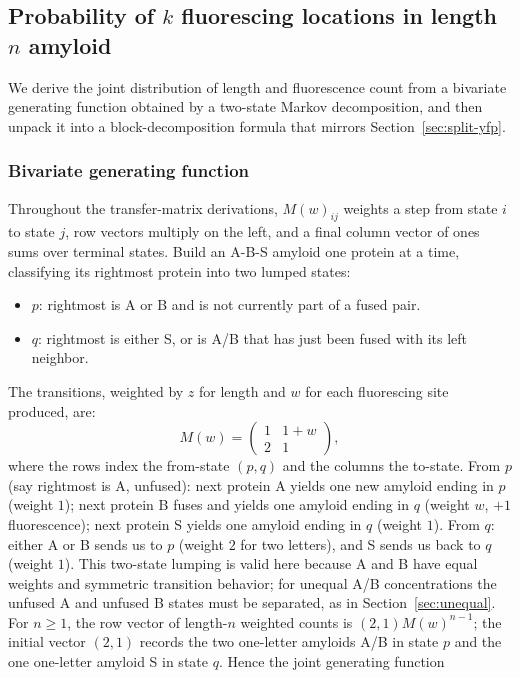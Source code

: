\documentclass[referee,lineno,pdflatex,sn-mathphys-ay]{sn-jnl}
\begin{document}
\subsection{Probability of $k$ fluorescing locations in length $n$ amyloid}\label{subsec:s3-dist}

We derive the joint distribution of length and fluorescence count from a bivariate generating function obtained by a two-state Markov decomposition, and then unpack it into a block-decomposition formula that mirrors Section~\ref{sec:split-yfp}.

\subsubsection{Bivariate generating function} Throughout the transfer-matrix derivations, $M(w)_{ij}$ weights a step from state $i$ to state $j$, row vectors multiply on the left, and a final column vector of ones sums over terminal states. Build an A-B-S amyloid one protein at a time, classifying its rightmost protein into two lumped states:
\begin{itemize}
\item \textbf{$p$}: rightmost is A or B and is not currently part of a fused pair.
\item \textbf{$q$}: rightmost is either S, or is A/B that has just been fused with its left neighbor.
\end{itemize}
The transitions, weighted by $z$ for length and $w$ for each fluorescing site produced, are:
\[
M(w) = \begin{pmatrix} 1 & 1 + w \\ 2 & 1 \end{pmatrix},
\]
where the rows index the from-state $(p, q)$ and the columns the to-state. From $p$ (say rightmost is A, unfused): next protein A yields one new amyloid ending in $p$ (weight $1$); next protein B fuses and yields one amyloid ending in $q$ (weight $w$, $+1$ fluorescence); next protein S yields one amyloid ending in $q$ (weight $1$). From $q$: either A or B sends us to $p$ (weight $2$ for two letters), and S sends us back to $q$ (weight $1$). This two-state lumping is valid here because A and B have equal weights and symmetric transition behavior; for unequal A/B concentrations the unfused A and unfused B states must be separated, as in Section~\ref{sec:unequal}. For $n \ge 1$, the row vector of length-$n$ weighted counts is $(2,1)M(w)^{n-1}$; the initial vector $(2,1)$ records the two one-letter amyloids A/B in state $p$ and the one one-letter amyloid S in state $q$. Hence the joint generating function
\end{document}
